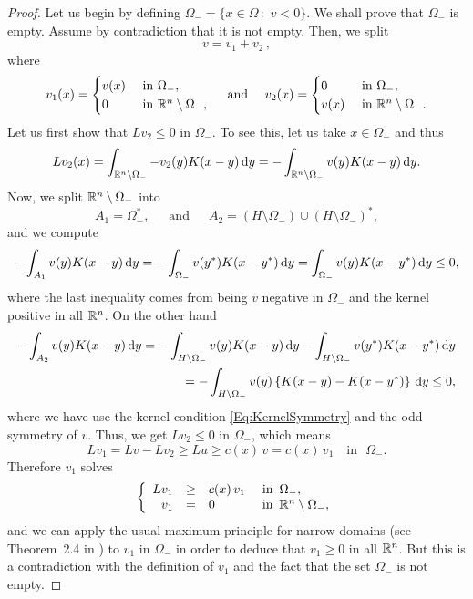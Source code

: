\begin{proof}
	Let us begin by defining $\Omega_- = \{x\in \Omega \,:\,\, v<0\}$. We shall prove that $\Omega_-$ is empty. Assume by contradiction that it is not empty. Then, we split 
	$$ v = v_1+v_2\,, $$
	where
	\begin{equation*}
	v_1(x) = 
	\begin{cases}
	v(x)  &\textrm{ in } \Omega_-,\\
	0 &\textrm{ in } \mathbb{R}^n\setminus\Omega_-,
	\end{cases}
	\quad \text{ and } \quad
	v_2(x) = 
	\begin{cases}
	0  &\textrm{ in } \Omega_-,\\
	v(x) &\textrm{ in } \mathbb{R}^n\setminus\Omega_-.
	\end{cases}
	\end{equation*}
	Let us first show that $Lv_2\leq 0$ in $\Omega_-$. To see this, let us take $x\in\Omega_-$ and thus
	$$ 
	Lv_2(x) = \int_{\mathbb{R}^n\setminus\Omega_-} -v_2(y)K(x-y) \,\mathrm{d} y = -\int_{\mathbb{R}^n\setminus\Omega_-} v(y)K(x-y) \,\mathrm{d} y.  
	$$
	Now, we split $\mathbb{R}^n\setminus\Omega_-$ into
	$$ 
	A_1 = \Omega_-^*,\,\,\,\,\,\,\,\text{ and }\,\,\,\,\,\,\, A_2 = \left(H\setminus\Omega_-\right)\cup\left(H\setminus\Omega_-\right)^*,
	$$
	and we compute
	\begin{align*}
	-\int_{A_1} v(y)K(x-y) \,\mathrm{d} y = -\int_{\Omega_-} v(y^*)K(x-y^*) \,\mathrm{d} y  = \int_{\Omega_-} v(y)K(x-y^*) \,\mathrm{d} y \leq 0,
	\end{align*}
	where the last inequality comes from being $v$ negative in $\Omega_-$ and the kernel positive in all $\mathbb{R}^n$.
	On the other hand
	\begin{align*}
	-\int_{A_2} v(y)K(x-y) \,\mathrm{d} y = -\int_{H\setminus\Omega_-} v(y)K(x-y) \,\mathrm{d} y  -\int_{H\setminus\Omega_-} v(y^*)K(x-y^*) \,\mathrm{d} y \\ 
	= -\int_{H\setminus\Omega_-} v(y)\left\{K(x-y)-K(x-y^*)\right\} \,\mathrm{d} y \leq 0,
	\end{align*}
	where we have use the kernel condition \eqref{Eq:KernelSymmetry} and the odd symmetry of $v$. Thus, we get $Lv_2 \leq 0$ in $\Omega_-$, which means
	$$ Lv_1 = Lv-Lv_2 \geq Lu \geq c(x)\,v = c(x)\,v_1 \,\,\,\,\text{ in }\,\,\Omega_-. $$
	Therefore $v_1$ solves
	\begin{equation*}
	\left\{\begin{array}{rcll}
	Lv_1 &\geq& c(x)\,v_1   &\textrm{ in } \,\Omega_-,\\
	v_1 &=& 0 &\textrm{ in }\,\mathbb{R}^n\setminus\Omega_-,
	\end{array} \right.
	\end{equation*}
	and we can apply the usual maximum principle for narrow domains (see Theorem~2.4 in \cite{QuaasXia}) to $v_1$ in $\Omega_-$ in order to deduce that $v_1\geq 0$ in all $\mathbb{R}^n$. But this is a contradiction with the definition of $v_1$ and the fact that the set $\Omega_-$ is not empty.
\end{proof}

